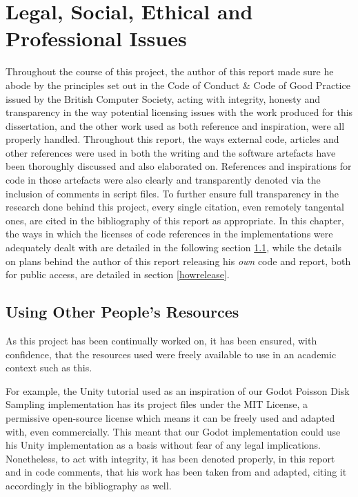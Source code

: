 \chapter{Legal, Social, Ethical and Professional Issues} \label{Issues}

Throughout the course of this project, the author of this report made sure he abode by the principles set out in the Code of Conduct \& Code of Good Practice issued by the British Computer Society\cite{bcscodeofconduct}, acting with integrity, honesty and transparency in the way potential licensing issues with the work produced for this dissertation, and the other work used as both reference and inspiration, were all properly handled. Throughout this report, the ways external code, articles and other references were used in both the writing and the software artefacts have been thoroughly discussed and also elaborated on. References and inspirations for code in those artefacts were also clearly and transparently denoted via the inclusion of comments in script files. To further ensure full transparency in the research done behind this project, every single citation, even remotely tangental ones, are cited in the bibliography of this report as appropriate. In this chapter, the ways in which the licenses of code references in the implementations were adequately dealt with are detailed in the following section \ref{howuse}, while the details on plans behind the author of this report releasing his \textit{own} code and report, both for public access, are detailed in section \ref{howrelease}.  

\section{Using Other People's Resources} \label{howuse}

As this project has been continually worked on, it has been ensured, with confidence, that the resources used were freely available to use in an academic context such as this.

For example, the Unity tutorial used as an inspiration of our Godot Poisson Disk Sampling implementation\cite{seblaguetuteYT} has its project files under the MIT License\cite{seblaguetuteGH}, a permissive open-source license which means it can be freely used and adapted with, even commercially.\cite{mitlicense} This meant that our Godot implementation could use his Unity implementation as a basis without fear of any legal implications. Nonetheless, to act with integrity, it has been denoted properly, in this report and in code comments, that his work has been taken from and adapted, citing it accordingly in the bibliography as well.

